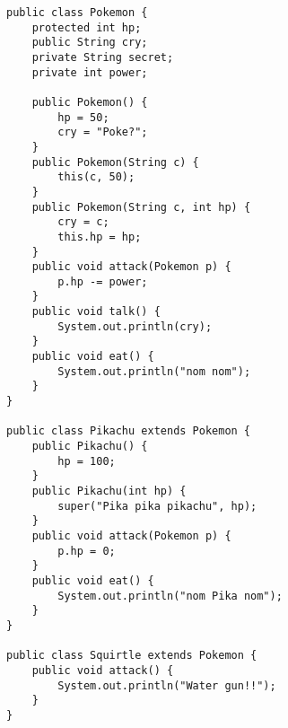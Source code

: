 \begin{lstlisting}
public class Pokemon {
    protected int hp;
    public String cry;
    private String secret;
    private int power;

    public Pokemon() {
        hp = 50;
        cry = "Poke?";
    }
    public Pokemon(String c) {
        this(c, 50);
    } 
    public Pokemon(String c, int hp) {
        cry = c;
        this.hp = hp;
    }
    public void attack(Pokemon p) {
        p.hp -= power;
    }
    public void talk() {
        System.out.println(cry);
    }
    public void eat() {
        System.out.println("nom nom");
    }
}

public class Pikachu extends Pokemon {
    public Pikachu() {
        hp = 100;
    }
    public Pikachu(int hp) {
        super("Pika pika pikachu", hp);
    }
    public void attack(Pokemon p) {
        p.hp = 0;
    }
    public void eat() {
        System.out.println("nom Pika nom");
    }
}

public class Squirtle extends Pokemon {
    public void attack() {
        System.out.println("Water gun!!");
    }
}
\end{lstlisting}